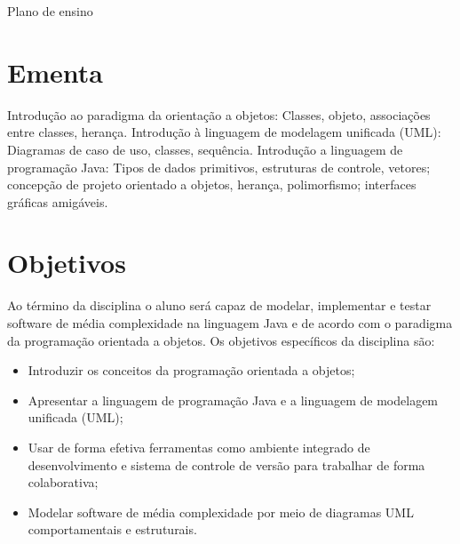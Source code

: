 \documentclass[11pt]{ifscarticle}
\begin{document}
\begin{center}
	{\huge Plano de ensino}\vspace*{.5cm}
\end{center}

\noindent{}\vspace*{.5cm}

\section{Ementa}

Introdução ao paradigma da orientação a objetos: Classes, objeto, associações entre classes, herança. Introdução à linguagem de modelagem unificada (UML): Diagramas de caso de uso, classes, sequência. Introdução a linguagem de programação Java: Tipos de dados primitivos, estruturas de controle, vetores; concepção de projeto orientado a objetos, herança, polimorfismo; interfaces gráficas amigáveis.

\section{Objetivos}

Ao término da disciplina o aluno será capaz de modelar, implementar e testar software de média complexidade na linguagem Java e de acordo com o paradigma da programação orientada a objetos. Os objetivos específicos da disciplina são:

\begin{itemize}
    \item Introduzir os conceitos da programação orientada a objetos;
    \item Apresentar a linguagem de programação Java e a linguagem de modelagem unificada (UML);
    \item Usar de forma efetiva ferramentas como ambiente integrado de desenvolvimento e sistema de controle de versão para trabalhar de forma colaborativa;
    \item Modelar software de média complexidade por meio de diagramas UML comportamentais e estruturais.
\end{itemize}
\end{document}
